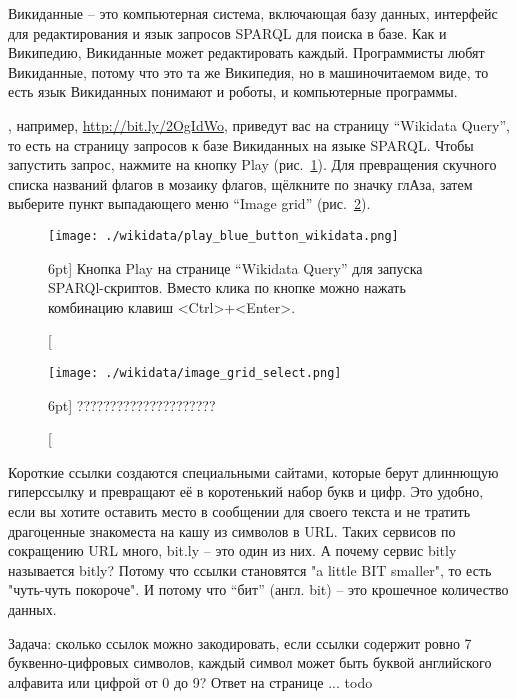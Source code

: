 \begin{mdfstyle}[nobreak=true,frametitle=На каком языке компьютеры читают Википедию?]
\sloppy 
    Викиданные -- это компьютерная система, включающая базу данных, интерфейс для редактирования и язык запросов SPARQL для поиска в базе. Как и Википедию, Викиданные может редактировать каждый. Программисты любят Викиданные, потому что это та же Википедия, но в машиночитаемом виде, то есть язык Викиданных понимают и роботы, и компьютерные программы.
\end{mdfstyle}

, например, \url{http://bit.ly/2OgIdWo}, 
приведут вас на страницу ``Wikidata Query'', 
то есть на страницу запросов к базе Викиданных на языке SPARQL. 
Чтобы запустить запрос, нажмите на кнопку Play (рис.~\ref{fig:blue:button}). 
Для превращения скучного списка названий флагов в мозаику флагов, 
щёлкните по значку глАза, затем выберите пункт выпадающего меню 
``Image grid'' (рис.~\ref{fig:wd:grid:select}).

\begin{figure}
  \texttt{[image: ./wikidata/play\_blue\_button\_wikidata.png]}
  \caption[Кнопка Play для запуска SPARQl-скриптов.][6pt]{
    Кнопка Play на странице ``Wikidata Query'' для запуска SPARQl-скриптов.
    Вместо клика по кнопке можно нажать комбинацию клавиш <Ctrl>+<Enter>.
}
  \label{fig:blue:button}
\end{figure}


\begin{figure}
  \texttt{[image: ./wikidata/image\_grid\_select.png]}
  \caption[????????????????????][6pt]{
    ?????????????????????
}
  \label{fig:wd:grid:select}
\end{figure}

\begin{mdframed}[nobreak=true]
\sloppy %
    Короткие ссылки создаются специальными сайтами, которые берут длиннющую 
    гиперссылку и превращают её в коротенький набор букв и цифр. Это удобно, 
    если вы хотите оставить место в сообщении для своего текста и 
    не тратить драгоценные знакоместа на кашу из символов в URL.  
    Таких сервисов по сокращению URL много, bit.ly -- это один из них. 
    А почему сервис bitly называется bitly? Потому что ссылки становятся "a little BIT smaller", то есть "чуть-чуть покороче". 
    И потому что ``бит'' (англ. bit) -- это крошечное количество данных. 
\end{mdframed}

Задача: сколько ссылок можно закодировать, если ссылки содержит ровно 7 буквенно-цифровых символов,
     каждый символ может быть буквой английского алфавита 
     или цифрой от 0 до 9? Ответ на странице ... todo 
